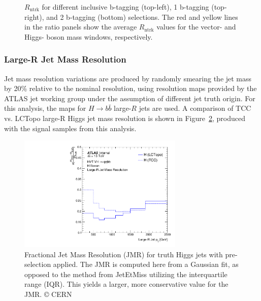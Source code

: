 \begin{figure}[htbp!]
\begin{center}
\end{center}
\caption{$R_{\mathrm{ntrk}}$ for different inclusive b-tagging (top-left), 1 b-tagging (top-right), and 2 b-tagging (bottom) selections. The red and yellow lines in the ratio panels show the average $R_{\mathrm{ntrk}}$ values for the vector- and Higgs- boson mass windows, respectively.}
\label{fig:double_ratio}
\end{figure}

\subsubsection{Large-R Jet Mass Resolution}
Jet mass resolution variations are produced by randomly smearing the jet mass by 20\% relative to the nominal resolution, using resolution maps provided by the ATLAS jet working group under the assumption of different jet truth origin.
For this analysis, the maps for $H \rightarrow b\bar{b}$ large-$R$ jets are used.
A comparison of TCC vs. LCTopo large-R Higgs jet mass resolution is shown in Figure~\ref{fig:jmr_higgs}, produced with the signal samples from this analysis.

\begin{figure}[htbp!]
\begin{center}
\includegraphics[width=0.7\textwidth]{JMR_Higgs_TCC.pdf}
\end{center}
\caption{
    Fractional Jet Mass Resolution (JMR) for truth Higgs jets with pre-selection applied.
    The JMR is computed here from a Gaussian fit, as opposed to the method from JetEtMiss utilizing the interquartile range (IQR).
    This yields a larger, more conservative value for the JMR.
    © CERN
}
\label{fig:jmr_higgs}
\end{figure}

